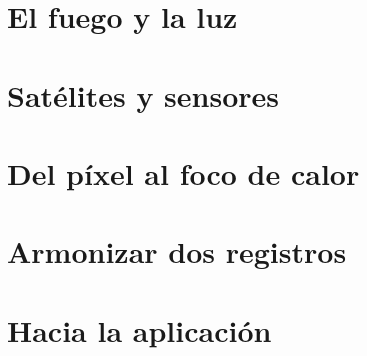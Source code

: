 \documentclass[11pt,oneside,openany]{book}
\begin{document}
\frontmatter

\tableofcontents


\mainmatter

\part{El fuego y la luz}




\part{Satélites y sensores}




\part{Del píxel al foco de calor}





\part{Armonizar dos registros}




\part{Hacia la aplicación}


\appendix



\end{document}
